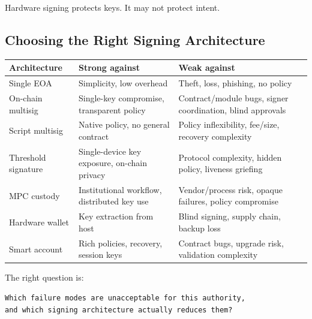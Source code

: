 Hardware signing protects keys. It may not protect intent.

\subsection{Choosing the Right Signing Architecture}

{\def\LTcaptype{none} %
\begin{longtable}[]{@{}
  >{\raggedright\arraybackslash}p{}
  >{\raggedright\arraybackslash}p{}
  >{\raggedright\arraybackslash}p{}@{}}
\toprule\noalign{}
\begin{minipage}[b]{\linewidth}\raggedright
Architecture
\end{minipage} & \begin{minipage}[b]{\linewidth}\raggedright
Strong against
\end{minipage} & \begin{minipage}[b]{\linewidth}\raggedright
Weak against
\end{minipage} \\
\midrule\noalign{}
\endhead
\bottomrule\noalign{}
\endlastfoot
Single EOA & Simplicity, low overhead & Theft, loss, phishing, no
policy \\
On-chain multisig & Single-key compromise, transparent policy &
Contract/module bugs, signer coordination, blind approvals \\
Script multisig & Native policy, no general contract & Policy
inflexibility, fee/size, recovery complexity \\
Threshold signature & Single-device key exposure, on-chain privacy &
Protocol complexity, hidden policy, liveness griefing \\
MPC custody & Institutional workflow, distributed key use &
Vendor/process risk, opaque failures, policy compromise \\
Hardware wallet & Key extraction from host & Blind signing, supply
chain, backup loss \\
Smart account & Rich policies, recovery, session keys & Contract bugs,
upgrade risk, validation complexity \\
\end{longtable}
}

The right question is:

\begin{lstlisting}
Which failure modes are unacceptable for this authority,
and which signing architecture actually reduces them?
\end{lstlisting}

